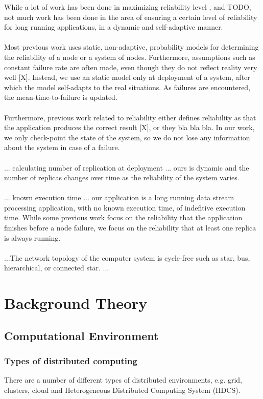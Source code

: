 \documentclass{cslthse-msc}
\begin{document}
While a lot of work has been done in maximizing reliability level \cite{X}, and TODO, not much work has been done in the area of  ensuring a certain level of reliability for long running applications, in a dynamic and self-adaptive manner.
\\\\
Most previous work uses static, non-adaptive, probability models for determining the reliability of a node or a system of nodes. Furthermore, assumptions such as constant failure rate are often made, even though they do not reflect reality very well [X]. Instead, we use an static model only at deployment of a system, after which the model self-adapts to the real situations. As failures are encountered, the mean-time-to-failure is updated.
\\\\
Furthermore, previous work related to reliability either defines reliability as that the application produces the correct result [X], or they bla bla bla. In our work, we only check-point the state of the system, so we do not lose any information about the system in case of a failure. 
\\\\
... calculating number of replication at deployment ... ours is dynamic and the number of replicas changes over time as the reliability of the system varies.
\\\\
... known execution time ... our application is a long running data stream processing application, with no known execution time, of indefitive execution time. While some previous work focus on the reliability that the application finishes before a node failure, we focus on the reliability that at least one replica is always running.
\\\\
...The network topology of the computer system is cycle-free such as star, bus, hierarchical, or connected star. \cite{taskAllocation}...

\chapter{Background Theory} \label{ch:background_theory}
\section{Computational Environment}
\subsection{Types of distributed computing}
There are a number of different types of distributed environments, e.g. grid, clusters, cloud and Heterogeneous Distributed Computing System (HDCS).
\end{document}
